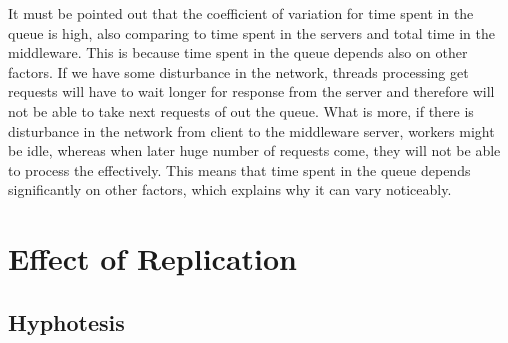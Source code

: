 \documentclass[11pt]{article}
\DeclarePairedDelimiter{\ceil}{\lceil}{\rceil}
\begin{document}
It must be pointed out that the coefficient of variation for time spent in the queue is high, also comparing to time spent in the servers and total time in the middleware. This is because time spent in the queue depends also on other factors. If we have some disturbance in the network, threads processing get requests will have to wait longer for response from the server and therefore will not be able to take next requests of out the queue. What is more, if there is disturbance in the network from client to the middleware server, workers might be idle, whereas when later huge number of requests come, they will not be able to process the effectively. This means that time spent in the queue depends significantly on other factors, which explains why it can vary noticeably.  

\pagebreak


\section{Effect of Replication}

\subsection{Hyphotesis}
\label{sec:replication-hyphotesis}
\end{document}
